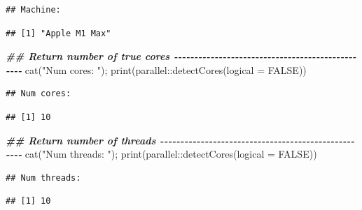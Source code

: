 \documentclass[
  11pt,
]{article}
\newenvironment{Shaded}{\begin{snugshade}}{\end{snugshade}}
\newcommand{\AttributeTok}[1]{\textcolor[rgb]{0.77,0.63,0.00}{#1}}
\newcommand{\ConstantTok}[1]{\textcolor[rgb]{0.00,0.00,0.00}{#1}}
\newcommand{\DocumentationTok}[1]{\textcolor[rgb]{0.56,0.35,0.01}{\textbf{\textit{#1}}}}
\newcommand{\FunctionTok}[1]{\textcolor[rgb]{0.00,0.00,0.00}{#1}}
\newcommand{\NormalTok}[1]{#1}
\newcommand{\SpecialCharTok}[1]{\textcolor[rgb]{0.00,0.00,0.00}{#1}}
\newcommand{\StringTok}[1]{\textcolor[rgb]{0.31,0.60,0.02}{#1}}
\begin{document}
\begin{verbatim}
## Machine:
\end{verbatim}

\begin{verbatim}
## [1] "Apple M1 Max"
\end{verbatim}

\begin{Shaded}
\begin{Highlighting}[]
\DocumentationTok{\#\# Return number of true cores {-}{-}{-}{-}{-}{-}{-}{-}{-}{-}{-}{-}{-}{-}{-}{-}{-}{-}{-}{-}{-}{-}{-}{-}{-}{-}{-}{-}{-}{-}{-}{-}{-}{-}{-}{-}{-}{-}{-}{-}{-}{-}{-}{-}{-}{-}{-}{-}{-}}
\FunctionTok{cat}\NormalTok{(}\StringTok{"Num cores:   "}\NormalTok{); }\FunctionTok{print}\NormalTok{(parallel}\SpecialCharTok{::}\FunctionTok{detectCores}\NormalTok{(}\AttributeTok{logical =} \ConstantTok{FALSE}\NormalTok{))}
\end{Highlighting}
\end{Shaded}

\begin{verbatim}
## Num cores:
\end{verbatim}

\begin{verbatim}
## [1] 10
\end{verbatim}

\begin{Shaded}
\begin{Highlighting}[]
\DocumentationTok{\#\# Return number of threads {-}{-}{-}{-}{-}{-}{-}{-}{-}{-}{-}{-}{-}{-}{-}{-}{-}{-}{-}{-}{-}{-}{-}{-}{-}{-}{-}{-}{-}{-}{-}{-}{-}{-}{-}{-}{-}{-}{-}{-}{-}{-}{-}{-}{-}{-}{-}{-}{-}{-}{-}{-}}
\FunctionTok{cat}\NormalTok{(}\StringTok{"Num threads: "}\NormalTok{); }\FunctionTok{print}\NormalTok{(parallel}\SpecialCharTok{::}\FunctionTok{detectCores}\NormalTok{(}\AttributeTok{logical =} \ConstantTok{FALSE}\NormalTok{))}
\end{Highlighting}
\end{Shaded}

\begin{verbatim}
## Num threads:
\end{verbatim}

\begin{verbatim}
## [1] 10
\end{verbatim}
\end{document}
